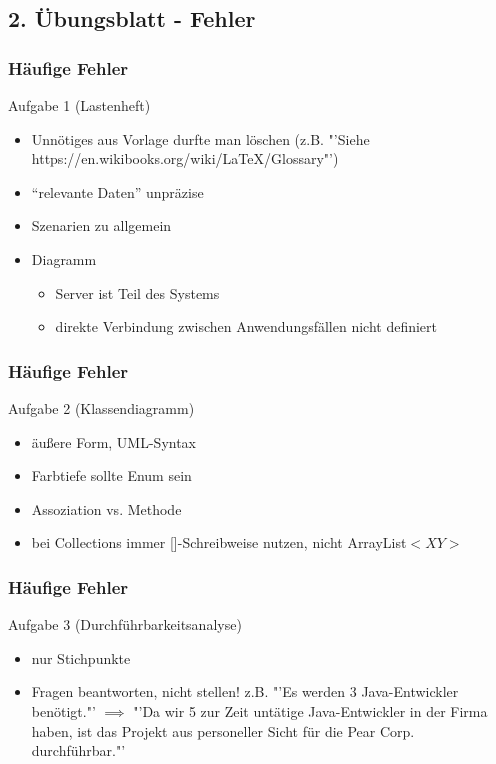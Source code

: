 \documentclass[18pt]{beamer}
\begin{document}
\subsection{2. Übungsblatt - Fehler}
\begin{frame}
		\frametitle{Häufige Fehler}
		\begin{block}{Aufgabe 1 (Lastenheft)}
			\begin{itemize}
				\item Unnötiges aus Vorlage durfte man löschen (z.B. "'Siehe https://en.wikibooks.org/wiki/LaTeX/Glossary"')
				\pause
				\item \enquote{relevante Daten} unpräzise
				\pause
				\item Szenarien zu allgemein
				\pause
				\item Diagramm
				\begin{itemize}
					\item Server ist Teil des Systems
					\item direkte Verbindung zwischen Anwendungsfällen nicht definiert
				\end{itemize}
			\end{itemize}
		\end{block}
\end{frame}

\begin{frame}
		\frametitle{Häufige Fehler}
		\begin{block}{Aufgabe 2 (Klassendiagramm)}
			\begin{itemize}
				\item äußere Form, UML-Syntax
				\pause
				\item Farbtiefe sollte Enum sein
				\pause
				\item Assoziation vs. Methode
				\pause
				\item bei Collections immer []-Schreibweise nutzen, nicht ArrayList$<XY>$
			\end{itemize}
		\end{block}
\end{frame}

\begin{frame}
		\frametitle{Häufige Fehler}
		\begin{block}{Aufgabe 3 (Durchführbarkeitsanalyse)}
			\begin{itemize}
				\item nur Stichpunkte
				\pause
				\item Fragen beantworten, nicht stellen!
				\linebreak z.B. "'Es werden 3 Java-Entwickler benötigt."' $\implies$
				"'Da wir 5 zur Zeit untätige Java-Entwickler in der Firma haben, ist das Projekt aus personeller Sicht für die Pear Corp. durchführbar."'
			\end{itemize}
		\end{block}
\end{frame}
\end{document}
